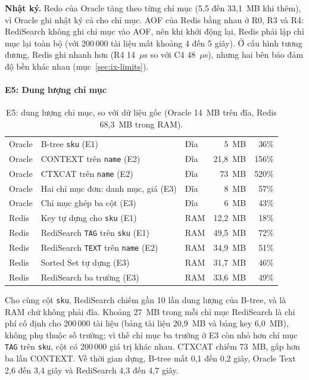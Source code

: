 \noindent\textbf{Nhật ký.} Redo của Oracle tăng theo từng chỉ mục (5,5 đến 33,1~MB khi thêm), vì Oracle ghi nhật ký cả cho chỉ mục. AOF của Redis bằng nhau ở R0, R3 và R4: RediSearch không ghi chỉ mục vào AOF, nên khi khởi động lại, Redis phải lập chỉ mục lại toàn bộ (với 200\,000 tài liệu mất khoảng 4 đến 5 giây). Ở cấu hình tương đương, Redis ghi nhanh hơn (R4 14~$\mu$s so với C4 48~$\mu$s), nhưng hai bên bảo đảm độ bền khác nhau (mục~\ref{sec:ix-limits}).

\paragraph{E5: Dung lượng chỉ mục}\label{sec:ix-e5}

\begin{table}[!htbp]
\centering
\caption{E5: dung lượng chỉ mục, so với dữ liệu gốc (Oracle 14~MB trên đĩa, Redis 68,3~MB trong RAM).}\label{tab:ix-e5}
\reporttablesetup
\begin{tabularx}{\linewidth}{|l|L|l|r|r|}
\hline
{}
 &  &  &  &  \\ \hline
Oracle & B-tree \texttt{sku} (E1) & Đĩa & 5~MB & 36\% \\ \hline
Oracle & CONTEXT trên \texttt{name} (E2) & Đĩa & 21,8~MB & 156\% \\ \hline
Oracle & CTXCAT trên \texttt{name} (E2) & Đĩa & 73~MB & 520\% \\ \hline
Oracle & Hai chỉ mục đơn: danh mục, giá (E3) & Đĩa & 8~MB & 57\% \\ \hline
Oracle & Chỉ mục ghép ba cột (E3) & Đĩa & 6~MB & 43\% \\ \hline
Redis & Key tự dựng cho \texttt{sku} (E1) & RAM & 12,2~MB & 18\% \\ \hline
Redis & RediSearch \texttt{TAG} trên \texttt{sku} (E1) & RAM & 49,5~MB & 72\% \\ \hline
Redis & RediSearch \texttt{TEXT} trên \texttt{name} (E2) & RAM & 34,9~MB & 51\% \\ \hline
Redis & Sorted Set tự dựng (E3) & RAM & 31,7~MB & 46\% \\ \hline
Redis & RediSearch ba trường (E3) & RAM & 33,6~MB & 49\% \\ \hline
\end{tabularx}
\end{table}

Cho cùng cột \texttt{sku}, RediSearch chiếm gần 10 lần dung lượng của B-tree, và là RAM chứ không phải đĩa. Khoảng 27~MB trong mỗi chỉ mục RediSearch là chi phí cố định cho 200\,000 tài liệu (bảng tài liệu 20,9~MB và bảng key 6,0~MB), không phụ thuộc số trường; vì thế chỉ mục ba trường ở E3 còn nhỏ hơn chỉ mục \texttt{TAG} trên \texttt{sku}, cột có 200\,000 giá trị khác nhau. CTXCAT chiếm 73~MB, gấp hơn ba lần CONTEXT. Về thời gian dựng, B-tree mất 0,1 đến 0,2 giây, Oracle Text 2,6 đến 3,4 giây và RediSearch 4,3 đến 4,7 giây.

